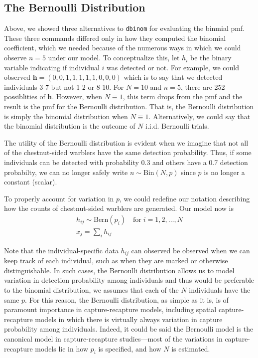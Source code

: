 \subsection{The Bernoulli Distribution}

Above, we showed three alternatives to \verb+dbinom+ for evaluating the
binmial pmf. These three commands differed only in how they computed
the binomial coefficient, which we needed because of the numerous ways
in which we could observe $n=5$ under our model. To conceptualize
this, let $h_i$ be the binary variable indicating if individual $i$
was detected or not.
For example, we could observed $\mathbf{h}=(0,0,1,1,1,1,1,0,0,0)$
which is to say that we detected individuals 3-7 but not 1-2 or
8-10. For $N=10$ and $n=5$, there
are 252 possiblities of $\mathbf{h}$. However, when $N \equiv 1$, this term
drops from the pmf and the result is the pmf for the Bernoulli
distribution. That is, the Bernoulli distribution is simply the
binomial distribution when $N \equiv 1$. Alternatively, we could say that the binomial
distribution is the outcome of $N$ i.i.d. Bernoulli trials.

The utility of the Bernoulli distribution is evident when we imagine
that not all of the chestnut-sided warblers have the same detection
probability. Thus, if some individuals can be detected with
probability 0.3 and others have a 0.7 detection probabilty, we can no
longer safely write $n \sim \text{Bin}(N, p)$ since $p$ is no
longer a constant (scalar). %

To properly account for variation in $p$, we could redefine our notation
describing how the counts of chestnut-sided warblers are
generated. Our model now is
\begin{gather}
h_{ij} \sim \text{Bern}(p_i) \quad \text{for} \; i=1,2,\dots,N \\
x_j = \sum_i h_{ij}
\label{modeling.eq.Bern}
\end{gather}

Note that the individual-specific data $h_{ij}$ can observed be
observed when we can keep track of each individual, such as when they
are marked or otherwise distinguishable. In such cases,
the Bernoulli distribution allows us to
model variation in detection probability among individuals and thus
would be preferable to the binomial distribution, we assumes that each
of the $N$ individuals have the same $p$.
For this reason, the Bernoulli
distribution, as simple as it is, is of paramount importance in
capture-recapture models, including spatial capture-recapture models
in which there is virtually always variation in capture probability
among individuals. Indeed, it could be said the Bernoulli model is the
canonical model in capture-recapture studies---most of the
variations in capture-recapture models lie in how $p_i$ is specified,
and how $N$ is estimated.

